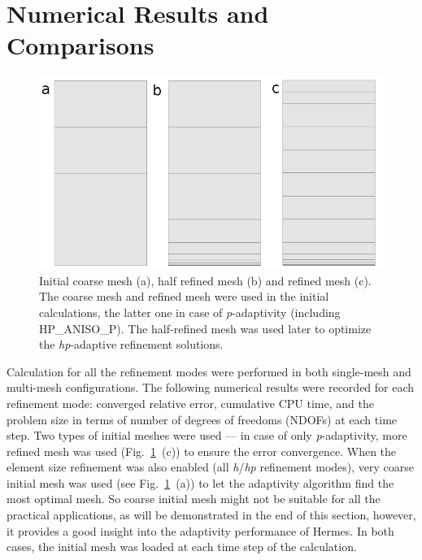 \section{Numerical Results and Comparisons}\label{sec:results}

\begin{figure}[!ht]
  \begin{centering}
  \includegraphics[width=.8\columnwidth]{mesh}
  \caption{\label{fig:mesh} Initial coarse mesh (a),
  	half refined mesh (b) and refined mesh (c). The coarse mesh
	and refined mesh were used in the initial calculations, the latter one
	in case of \emph{p}-adaptivity (including HP\_ANISO\_P). The half-refined mesh was
	used later to optimize the \emph{hp}-adaptive refinement solutions.}
  \end{centering}
\end{figure}
Calculation for all the refinement modes were performed
in both single-mesh and multi-mesh configurations. 
The following numerical results were recorded for each 
refinement mode: converged relative error, cumulative CPU
time, and the problem size in terms of number
of degrees of freedoms (NDOFs) at each time step. 
Two types of initial meshes were used --- in case of only \emph{p}-adaptivity,
more refined mesh was used (Fig.~\ref{fig:mesh}~(c)) to ensure
the error convergence.
When the element size refinement
was also enabled (all \emph{h}/\emph{hp} refinement modes), very coarse initial mesh
was used (see Fig.~\ref{fig:mesh}~(a)) to let the adaptivity
algorithm find the most optimal mesh. So coarse initial mesh might not be
suitable for all the practical applications, as will be demonstrated in the
end of this section, however, it provides a good insight into the
adaptivity performance of Hermes.
In both cases, the initial mesh was loaded at each time step of the
calculation.

